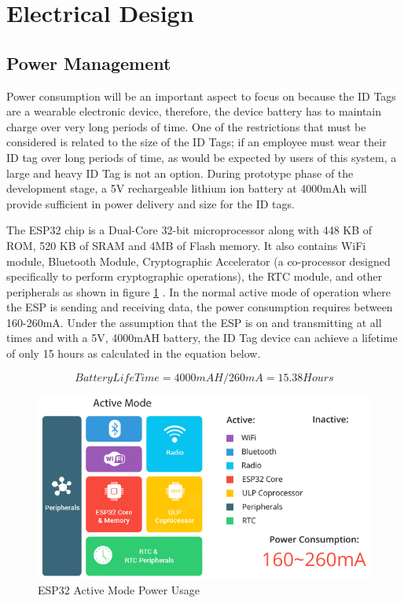 

\setcounter{section}{4}
\section{Electrical Design}
\bigskip

\subsection{Power Management}
\medskip

Power consumption will be an important aspect to focus on because the ID Tags are a wearable electronic device, therefore, the device battery has to maintain charge over very long periods of time. One of the restrictions that must be considered is related to the size of the ID Tags; if an employee must wear their ID tag over long periods of time, as would be expected by users of this system, a large and heavy ID Tag is not an option. During prototype phase of the development stage, a 5V rechargeable lithium ion battery at 4000mAh will provide sufficient in power delivery and size for the ID tags. 

\bigskip
The ESP32 chip is a Dual-Core 32-bit microprocessor along with 448 KB of ROM, 520 KB of SRAM and 4MB of Flash memory. It also contains WiFi module, Bluetooth Module, Cryptographic Accelerator (a co-processor designed specifically to perform cryptographic operations), the RTC module, and other peripherals as shown in figure \ref{a_mode} \cite{R5-1-1}. In the normal active mode of operation where the ESP is sending and receiving data, the power consumption requires between 160-260mA. Under the assumption that the ESP is on and transmitting at all times and with a 5V, 4000mAH battery, the ID Tag device can achieve a lifetime of only 15 hours as calculated in the equation below.

\medskip
\begin{equation}
Battery Life Time = 4000mAH/260mA = 15.38 Hours
\end{equation}

\medskip
\begin{figure}[H]
\centering
    \includegraphics[scale=0.7]{./images/active_mode.png}
    \caption{ESP32 Active Mode Power Usage}
    \label{a_mode}
\end{figure}

